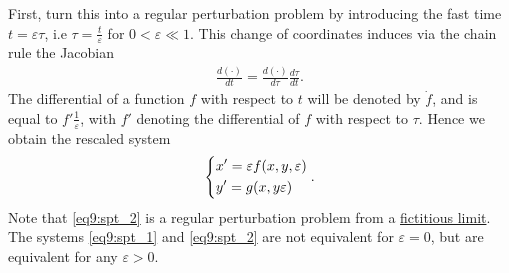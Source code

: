 First, turn this into a regular perturbation problem by introducing the fast time $t = \varepsilon \tau$, i.e $\tau = \frac{t}{\varepsilon}$ for $0 < \varepsilon \ll 1$. This change of coordinates induces via the chain rule the Jacobian
\begin{align}
	\frac{d (\cdot) }{dt} = \frac{d( \cdot) }{d \tau }\frac{d \tau}{dt}.
\end{align}
The differential of a function $f$ with respect to $t$ will be denoted by $\dot{f}$, and is equal to $f' \frac{1}{\varepsilon}$, with $f'$ denoting the differential of $f$ with respect to $\tau$. Hence we obtain the rescaled system
\begin{align}
\begin{dcases}
	x' = \varepsilon f(x,y, \varepsilon) \\
	y' = g(x,y \varepsilon)
\end{dcases}
. \label{eq9:spt_2}	
\end{align}
Note that \eqref{eq9:spt_2} is a regular perturbation problem from a \underline{fictitious limit}. The systems \eqref{eq9:spt_1} and \eqref{eq9:spt_2} are not equivalent for  $\varepsilon=0$, but are equivalent for any $\varepsilon >0$. 

